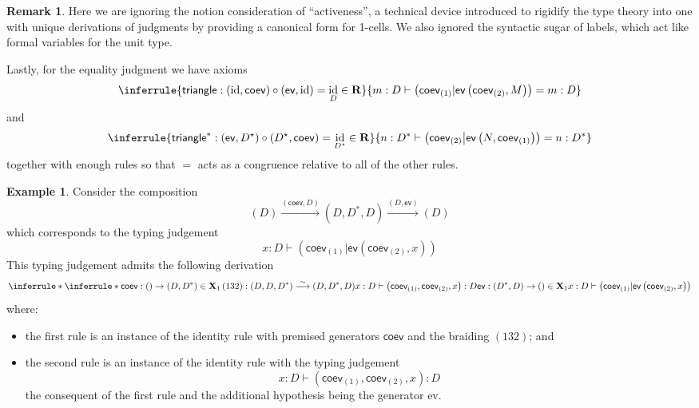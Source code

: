 \documentclass[pra,floatfix,
amsmath,superscriptaddress, 12pt]{article}
\theoremstyle{definition}
\newtheorem*{remark}{Remark}
\newtheorem*{example}{Example}
\newcommand{\liso}{\overset{\sim}{\longrightarrow}}
\newcommand{\evmap}{\mathsf{ev}}
\newcommand{\coev}{\mathsf{coev}}
\newcommand{\msf}[1]{\mathsf{#1}}
\DeclareMathOperator{\id}{{\normalfont\text{id}}}
\begin{document}
\begin{remark} Here we are ignoring the notion consideration of ``activeness'', a technical device introduced to rigidify the type theory into one with unique derivations of judgments by providing a canonical form for 1-cells. We also ignored the syntactic sugar of labels, which act like formal variables for the unit type.
\end{remark}
%
%
Lastly, for the equality judgment we have axioms
%
        \[
            \inferrule{\msf{triangle}: (\id, \coev) \circ (\evmap, \id) = \id_{D}
                            \in
                                \mathbf{R}
                        }{
                            m:D \vdash \left(\coev_{\left(1\right)}|\evmap\left(\coev_{\left(2\right)},M\right)\right) = m:D
                        }
        \]
        and    
        \[
            \inferrule{
                            \mathsf{triangle}^{*}:(\evmap,D^\star)\circ(D^\star,\coev) = \id_{D^\star} \in \mathbf{R}
                        }{
                            n:D^{*}\vdash\left(\coev_{\left(2\right)} \middle| \evmap\left(N,\coev_{\left(1\right)}\right)\right)=n:D^{*}
                        }
        \]
    together with enough rules  so that $=$ acts as a congruence relative to all of the other rules.

\begin{example} Consider the composition
\[
    (D)\xrightarrow{(\coev,D)} (D,D^{*},D) \xrightarrow{(D,\evmap)} (D)
\]
%
%
%
%
which  corresponds to the typing judgement
%
\[
    x:D\vdash\left(\coev_{\left(1\right)}|\evmap\left(\coev_{\left(2\right)},x\right)\right)
\]
%
This typing judgement admits the following derivation
%
\[
\inferrule*{
    \inferrule*{
        \coev:() \rightarrow (D,D^*) \in \mathbf{X}_1
            \\
            \left(132\right):\left(D,D,D^{*}\right)\liso\left(D,D^{*},D\right)
    }{
        x:D\vdash\left(\coev_{\left(1\right)},\coev_{\left(2\right)},x\right):D
    }
        \\
        \evmap: (D^*,D) \rightarrow () \in \mathbf{X}_1
    }{
        x:D\vdash\left(\coev_{\left(1\right)}|\evmap\left(\coev_{\left(2\right)},x\right)\right)
    }
\]
where:
\begin{itemize}
    \item the first rule is an instance of the identity rule with premised generators $\coev$ and the braiding $(132)$; and
    \item the second rule is an instance of the identity rule with the typing judgement $$x:D\vdash\left(\coev_{\left(1\right)},\coev_{\left(2\right)},x\right):D$$ the consequent of the first rule and the additional hypothesis being the generator \textsf{ev}.  
\end{itemize} 
\end{example}
%
\end{document}
